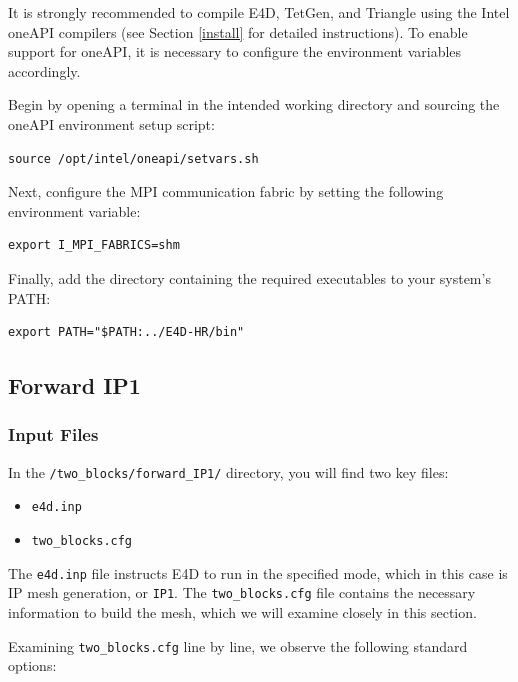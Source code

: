 \documentclass[a4paper,12pt]{article}
\begin{document}
It is strongly recommended to compile E4D, TetGen, and Triangle using the Intel oneAPI compilers (see Section \ref{install} for detailed instructions). To enable support for oneAPI, it is necessary to configure the environment variables accordingly.

Begin by opening a terminal in the intended working directory and sourcing the oneAPI environment setup script:

\begin{verbatim}
source /opt/intel/oneapi/setvars.sh
\end{verbatim}

Next, configure the MPI communication fabric by setting the following environment variable:

\begin{verbatim}
export I_MPI_FABRICS=shm
\end{verbatim}

Finally, add the directory containing the required executables to your system’s PATH:

\begin{verbatim}
export PATH="$PATH:../E4D-HR/bin"
\end{verbatim}



\subsection{Forward IP1}

\subsubsection{Input Files}

In the \texttt{/two\_blocks/forward\_IP1/} directory, you will find two key files:

\begin{itemize}
    \item \texttt{e4d.inp}
    \item \texttt{two\_blocks.cfg}
\end{itemize}

The \texttt{e4d.inp} file instructs E4D to run in the specified mode, which in this case is IP mesh generation, or \texttt{IP1}. The \texttt{two\_blocks.cfg} file contains the necessary information to build the mesh, which we will examine closely in this section.

Examining \texttt{two\_blocks.cfg} line by line, we observe the following standard options:
\end{document}
